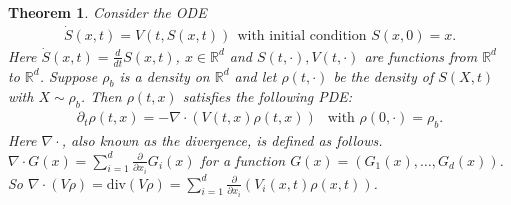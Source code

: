 \documentclass{scrartcl}
\newtheorem{theorem}{Theorem}[section]
\newcommand{\R}{{\mathbb R}}
\begin{document}
\begin{theorem}\label{continuity}
  Consider the ODE 
  \begin{align}\label{ode}
    \dot{S}(x, t) = V(t, S(x, t)) ~~\text{with initial condition $S(x,
    0) = x$}. 
  \end{align}
  Here $\dot{S}(x, t) = \frac{d}{dt}S(x, t)$, $x \in \R^d$ and $S(t,
  \cdot), V(t, \cdot)$ are functions from $\R^d$ to $\R^d$. Suppose
  $\rho_b$ is a density on $\R^d$ and let $\rho(t, \cdot)$ be the 
  density of $S(X, t)$ with $X \sim \rho_b$. Then $\rho(t, x)$
  satisfies the following PDE:
  \begin{align}\label{pdecont}
    \partial_t \rho(t, x) = -\nabla \cdot \left(V(t, x) \rho(t, x)
    \right) ~~ \text{ with $\rho(0, \cdot) = \rho_b$}. 
  \end{align}
  Here $\nabla \cdot$, also known as the divergence, is defined as
  follows. $\nabla \cdot G(x) = \sum_{i=1}^d \frac{\partial}{\partial
    x_i} G_i(x)$ for a function $G(x) = (G_1(x), \dots, G_d(x))$. So
  $\nabla \cdot (V \rho) = \mathrm{div} (V \rho) = \sum_{i=1}^d
  \frac{\partial}{\partial x_i} (V_i(x, t) \rho(x, t))$. 
\end{theorem}
\end{document}
